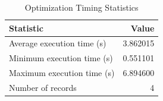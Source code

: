 
\begin{table}[h!]
\centering
\begin{tabular}{l r}
\hline
Statistic & Value \\
\hline
Average execution time (s) & 3.862015 \\
Minimum execution time (s) & 0.551101 \\
Maximum execution time (s) & 6.894600 \\
Number of records & 4 \\
\hline
\end{tabular}
\caption{Optimization Timing Statistics}
\end{table}
